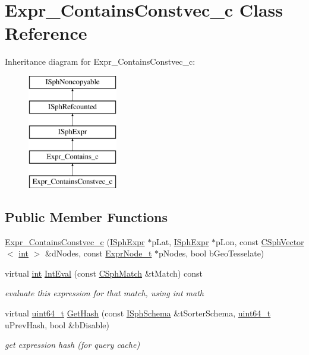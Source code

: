 \hypertarget{classExpr__ContainsConstvec__c}{\section{Expr\-\_\-\-Contains\-Constvec\-\_\-c Class Reference}
\label{classExpr__ContainsConstvec__c}
}
Inheritance diagram for Expr\-\_\-\-Contains\-Constvec\-\_\-c\-:\begin{figure}[H]
\begin{center}
\leavevmode
\includegraphics[height=5.000000cm]{classExpr__ContainsConstvec__c}
\end{center}
\end{figure}
\subsection*{Public Member Functions}
\begin{DoxyCompactItemize}
\item 
\hyperlink{classExpr__ContainsConstvec__c_ad7365beeff65a83ed44f0a759fc5c2e0}{Expr\-\_\-\-Contains\-Constvec\-\_\-c} (\hyperlink{structISphExpr}{I\-Sph\-Expr} $\ast$p\-Lat, \hyperlink{structISphExpr}{I\-Sph\-Expr} $\ast$p\-Lon, const \hyperlink{classCSphVector}{C\-Sph\-Vector}$<$ \hyperlink{sphinxexpr_8cpp_a4a26e8f9cb8b736e0c4cbf4d16de985e}{int} $>$ \&d\-Nodes, const \hyperlink{structExprNode__t}{Expr\-Node\-\_\-t} $\ast$p\-Nodes, bool b\-Geo\-Tesselate)
\item 
virtual \hyperlink{sphinxexpr_8cpp_a4a26e8f9cb8b736e0c4cbf4d16de985e}{int} \hyperlink{classExpr__ContainsConstvec__c_a4be34c3593a3d0f8acb659476667add4}{Int\-Eval} (const \hyperlink{classCSphMatch}{C\-Sph\-Match} \&t\-Match) const 
\begin{DoxyCompactList}\small\item\em evaluate this expression for that match, using int math \end{DoxyCompactList}\item 
virtual \hyperlink{sphinxstd_8h_aaa5d1cd013383c889537491c3cfd9aad}{uint64\-\_\-t} \hyperlink{classExpr__ContainsConstvec__c_a3d8e9d981f90220385ce3bf682829872}{Get\-Hash} (const \hyperlink{classISphSchema}{I\-Sph\-Schema} \&t\-Sorter\-Schema, \hyperlink{sphinxstd_8h_aaa5d1cd013383c889537491c3cfd9aad}{uint64\-\_\-t} u\-Prev\-Hash, bool \&b\-Disable)
\begin{DoxyCompactList}\small\item\em get expression hash (for query cache) \end{DoxyCompactList}\end{DoxyCompactItemize}
